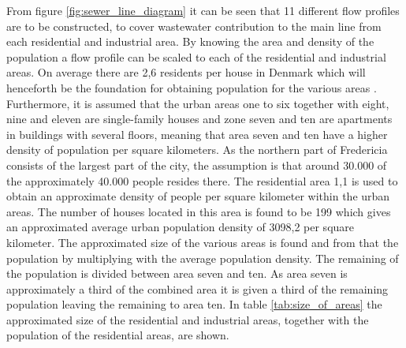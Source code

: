 From figure \ref{fig:sewer_line_diagram} it can be seen that 11 different flow profiles are to be constructed, to cover wastewater contribution to the main line from each residential and industrial area. %
By knowing the area and density of the population a flow profile can be scaled to each of the residential and industrial areas. 
On average there are 2,6 residents per house in Denmark which will henceforth be the foundation for obtaining population for the various areas \cite{nykredit}. 
Furthermore, it is assumed that the urban areas one to six together with eight, nine and eleven are single-family houses and zone seven and ten are apartments in buildings with several floors, meaning that area seven and ten have a higher density of population per square kilometers.
As the northern part of Fredericia consists of the largest part of the city, the assumption is that around 30.000 of the approximately 40.000 people resides there. 
The residential area 1,1 is used to obtain an approximate density of people per square kilometer within the urban areas. The number of houses located in this area is found to be 199 which gives an approximated average urban population density of 3098,2 per square kilometer.
The approximated size of the various areas is found and from that the population by multiplying with the average population density. The remaining of the population is divided between area seven and ten. As area seven is approximately a third of the combined area it is given a third of the remaining population leaving the remaining to area ten.
In table \ref{tab:size_of_areas} the approximated size of the residential and industrial areas, together with the population of the residential areas, are shown. 

